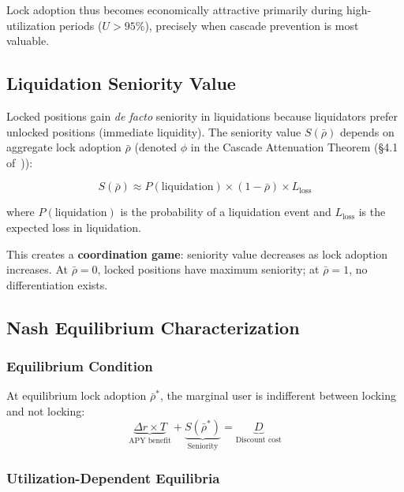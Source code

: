 \documentclass[10pt,a4paper,twocolumn]{article}
\begin{document}
Lock adoption thus becomes economically attractive primarily during high-utilization periods ($U > 95\%$), precisely when cascade prevention is most valuable.

\subsection{Liquidation Seniority Value}

Locked positions gain \emph{de facto} seniority in liquidations because liquidators prefer unlocked positions (immediate liquidity). The seniority value $S(\bar{\rho})$ depends on aggregate lock adoption $\bar{\rho}$ (denoted $\phi$ in the Cascade Attenuation Theorem (\S4.1 of~\cite{wp})):

\begin{equation}
S(\bar{\rho}) \approx P(\text{liquidation}) \times (1 - \bar{\rho}) \times L_{\text{loss}}
\end{equation}

where $P(\text{liquidation})$ is the probability of a liquidation event and $L_{\text{loss}}$ is the expected loss in liquidation.

This creates a \textbf{coordination game}: seniority value decreases as lock adoption increases. At $\bar{\rho} = 0$, locked positions have maximum seniority; at $\bar{\rho} = 1$, no differentiation exists.

\subsection{Nash Equilibrium Characterization}

\subsubsection{Equilibrium Condition}

At equilibrium lock adoption $\bar{\rho}^*$, the marginal user is indifferent between locking and not locking:
\begin{equation}
\underbrace{\Delta r \times T}_{\text{APY benefit}} + \underbrace{S(\bar{\rho}^*)}_{\text{Seniority}} = \underbrace{D}_{\text{Discount cost}}
\end{equation}

\subsubsection{Utilization-Dependent Equilibria}
\end{document}
